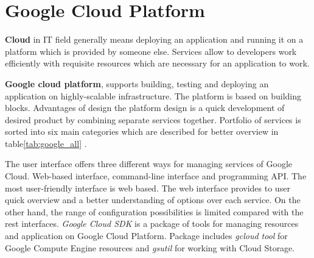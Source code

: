 \documentclass[a4paper,12pt,oneside]{report}
\begin{document}
		
	\section{Google Cloud Platform}
\textbf{Cloud} in IT field generally means deploying an application and running it on a platform which is 
provided by someone else. Services allow to developers  work efficiently  with 
requisite resources which are necessary for an application to work.

\textbf{Google cloud platform}, supports building, testing and deploying an application on highly-scalable 
infrastructure.
The platform is based on building blocks. Advantages of design the platform design is a quick development of 
desired product by combining separate services together. Portfolio of services is sorted into six main categories 
which are described for better overview in 
table\ref{tab:google_all} \cite{gc_product_services}.

The user interface offers three different ways for managing services of Google Cloud. Web-based interface, command-line 
interface and programming API. The most user-friendly interface is web based. The web interface provides to 
user quick overview and a better understanding of 
options over each service. On the other hand, the range of configuration possibilities is limited compared with the rest 
interfaces. \textit{Google Cloud SDK} is a 
package of tools for managing resources and application on Google Cloud Platform. 
Package includes \textit{gcloud tool} for Google Compute Engine resources and \textit{gsutil} for working with Cloud Storage.
\end{document}
